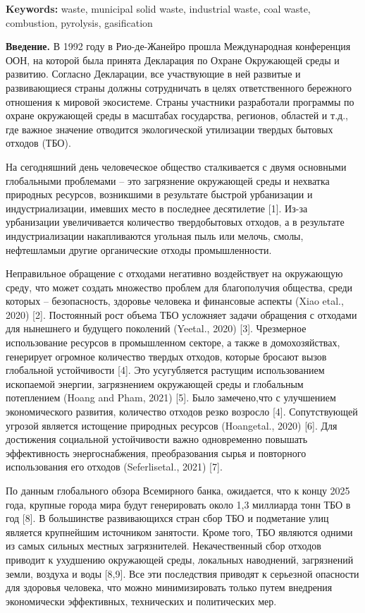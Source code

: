 {\bfseries Keywords:} waste, municipal solid waste, industrial waste, coal
waste, combustion, pyrolysis, gasification

{\bfseries Введение.} В 1992 году в Рио-де-Жанейро прошла Международная
конференция ООН, на которой была принята Декларация по Охране Окружающей
среды и развитию. Согласно Декларации, все участвующие в ней развитые и
развивающиеся страны должны сотрудничать в целях ответственного
бережного отношения к мировой экосистеме. Страны участники разработали
программы по охране окружающей среды в масштабах государства, регионов,
областей и т.д., где важное значение отводится экологической утилизации
твердых бытовых отходов (ТБО).

На сегодняшний день человеческое общество сталкивается с двумя основными
глобальными проблемами -- это загрязнение окружающей среды и нехватка
природных ресурсов, возникшими в результате быстрой урбанизации и
индустриализации, имевших место в последнее десятилетие {[}1{]}. Из-за
урбанизации увеличивается количество твердобытовых отходов, а в
результате индустриализации накапливаются угольная пыль или мелочь,
смолы, нефтешламыи другие органические отходы промышленности.

Неправильное обращение с отходами негативно воздействует на окружающую
среду, что может создать множество проблем для благополучия общества,
среди которых -- безопасность, здоровье человека и финансовые аспекты
(Xiao etal., 2020) {[}2{]}. Постоянный рост объема ТБО усложняет задачи
обращения с отходами для нынешнего и будущего поколений (Yeetal., 2020)
{[}3{]}. Чрезмерное использование ресурсов в промышленном секторе, а
также в домохозяйствах, генерирует огромное количество твердых отходов,
которые бросают вызов глобальной устойчивости {[}4{]}. Это усугубляется
растущим использованием ископаемой энергии, загрязнением окружающей
среды и глобальным потеплением (Hoang and Pham, 2021) {[}5{]}. Было
замечено,что с улучшением экономического развития, количество отходов
резко возросло {[}4{]}. Сопутствующей угрозой является истощение
природных ресурсов (Hoangetal., 2020) {[}6{]}. Для достижения социальной
устойчивости важно одновременно повышать эффективность энергоснабжения,
преобразования сырья и повторного использования его отходов
(Seferlisetal., 2021) {[}7{]}.

По данным глобального обзора Всемирного банка, ожидается, что к концу
2025 года, крупные города мира будут генерировать около 1,3 миллиарда
тонн ТБО в год {[}8{]}. В большинстве развивающихся стран сбор ТБО и
подметание улиц является крупнейшим источником занятости. Кроме того,
ТБО являются одними из самых сильных местных загрязнителей.
Некачественный сбор отходов приводит к ухудшению окружающей среды,
локальных наводнений, загрязнений земли, воздуха и воды {[}8,9{]}. Все
эти последствия приводят к серьезной опасности для здоровья человека,
что можно минимизировать только путем внедрения экономически
эффективных, технических и политических мер.

